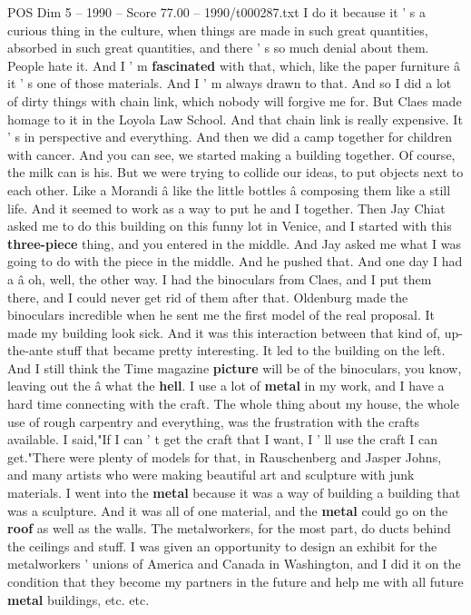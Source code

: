 \begin{textsample}{POS Dim 5 – 1990 – Score 77.00 – 1990/t000287.txt}
I do it because it ' s a curious thing in the culture, when things are made in such great quantities, absorbed in such great quantities, and there ' s so much denial about them.
People hate it.
And I ' m \textbf{fascinated} with that, which, like the paper furniture â it ' s one of those materials.
And I ' m always drawn to that.
And so I did a lot of dirty things with chain link, which nobody will forgive me for.
But Claes made homage to it in the Loyola Law School.
And that chain link is really expensive.
It ' s in perspective and everything.
And then we did a camp together for children with cancer.
And you can see, we started making a building together.
Of course, the milk can is his.
But we were trying to collide our ideas, to put objects next to each other.
Like a Morandi â like the little bottles â composing them like a still life.
And it seemed to work as a way to put he and I together.
Then Jay Chiat asked me to do this building on this funny lot in Venice, and I started with this \textbf{three-piece} thing, and you entered in the middle.
And Jay asked me what I was going to do with the piece in the middle.
And he pushed that.
And one day I had a â oh, well, the other way.
I had the binoculars from Claes, and I put them there, and I could never get rid of them after that.
Oldenburg made the binoculars incredible when he sent me the first model of the real proposal.
It made my building look sick.
And it was this interaction between that kind of, up-the-ante stuff that became pretty interesting.
It led to the building on the left.
And I still think the Time magazine \textbf{picture} will be of the binoculars, you know, leaving out the â what the \textbf{hell}.
I use a lot of \textbf{metal} in my work, and I have a hard time connecting with the craft.
The whole thing about my house, the whole use of rough carpentry and everything, was the frustration with the crafts available.
I said,"If I can ' t get the craft that I want, I ' ll use the craft I can get."There were plenty of models for that, in Rauschenberg and Jasper Johns, and many artists who were making beautiful art and sculpture with junk materials.
I went into the \textbf{metal} because it was a way of building a building that was a sculpture.
And it was all of one material, and the \textbf{metal} could go on the \textbf{roof} as well as the walls.
The metalworkers, for the most part, do ducts behind the ceilings and stuff.
I was given an opportunity to design an exhibit for the metalworkers ' unions of America and Canada in Washington, and I did it on the condition that they become my partners in the future and help me with all future \textbf{metal} buildings, etc. etc.

\end{textsample}
